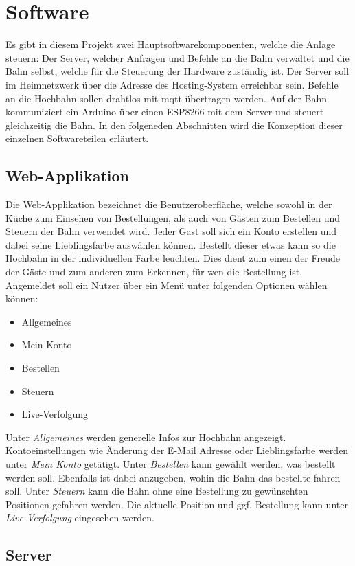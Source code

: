 \section{Software}
Es gibt in diesem Projekt zwei Hauptsoftwarekomponenten, welche die Anlage steuern: Der Server, welcher Anfragen und Befehle an die Bahn verwaltet und die Bahn selbst,
welche für die Steuerung der Hardware zuständig ist. Der Server soll im Heimnetzwerk über die Adresse des Hosting-System erreichbar sein. Befehle an die Hochbahn sollen drahtlos mit \acrshort{mqtt} übertragen werden.
Auf der Bahn kommuniziert ein Arduino über einen ESP8266 mit dem Server und steuert gleichzeitig die Bahn. In den folgeneden Abschnitten wird die Konzeption dieser einzelnen Softwareteilen erläutert.

\subsection{Web-Applikation}
Die Web-Applikation bezeichnet die Benutzeroberfläche, welche sowohl in der Küche zum Einsehen von Bestellungen, als auch von Gästen zum Bestellen und Steuern der Bahn verwendet wird. Jeder Gast soll sich ein Konto erstellen und dabei seine Lieblingsfarbe auswählen können.
Bestellt dieser etwas kann so die Hochbahn in der individuellen Farbe leuchten. Dies dient zum einen der Freude der Gäste und zum anderen zum Erkennen, für wen die Bestellung ist. Angemeldet soll ein Nutzer über ein Menü unter folgenden Optionen
wählen können:
\begin{itemize}
	\item Allgemeines
	\item Mein Konto
	\item Bestellen
	\item Steuern
	\item Live-Verfolgung
\end{itemize}
Unter \textit{Allgemeines} werden generelle Infos zur Hochbahn angezeigt. Kontoeinstellungen wie Änderung der E-Mail Adresse oder Lieblingsfarbe werden unter \textit{Mein Konto} getätigt. Unter \textit{Bestellen} kann gewählt werden, was bestellt werden soll.
Ebenfalls ist dabei anzugeben, wohin die Bahn das bestellte fahren soll. Unter \textit{Steuern} kann die Bahn ohne eine Bestellung zu gewünschten Positionen gefahren werden. Die aktuelle Position und ggf. Bestellung kann unter \textit{Live-Verfolgung} eingesehen werden.
\subsection{Server}
